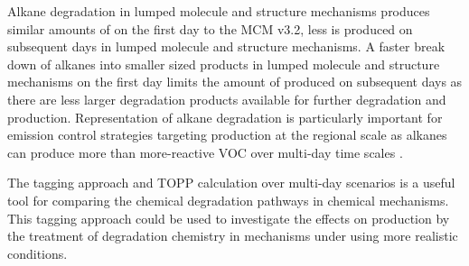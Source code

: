 Alkane degradation in lumped molecule and structure mechanisms produces similar amounts of  on the first day to the MCM v3.2, less  is produced on subsequent days in lumped molecule and structure mechanisms.
A faster break down of alkanes into smaller sized products in lumped molecule and structure mechanisms on the first day limits the amount of  produced on subsequent days as there are less larger degradation products available for further degradation and  production.
Representation of alkane degradation is particularly important for emission control strategies targeting  production at the regional scale as alkanes can produce more  than more-reactive VOC over multi-day time scales \citep{Butler:2011}.

The tagging approach and TOPP calculation over multi-day scenarios is a useful tool for comparing the chemical degradation pathways in chemical mechanisms. 
This tagging approach could be used to investigate the effects on  production by the treatment of degradation chemistry in mechanisms under using more realistic  conditions.
